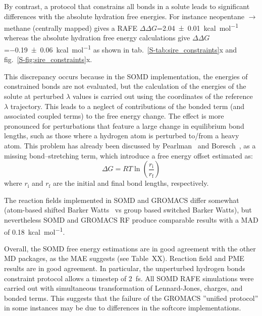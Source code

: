 \documentclass[journal=jctcce,manuscript=article]{achemso}
\begin{document}
By contrast, a protocol that constrains all bonds in a solute leads to 
significant differences with the absolute hydration free energies. For instance 
neopentane $\rightarrow$ methane (centrally mapped) gives a RAFE
$\Delta\Delta G$=\SI{2.04 +- 0.01}{kcal.mol^{-1}}  whereas the absolute 
hydration free energy calculations give $\Delta\Delta 
G$=\SI{-0.19+-0.06}{kcal.mol^{-1}} as shown in 
tab.~\ref{S-tab:sire_constraints}x and fig.~\ref{S-fig:sire_constraints}x.

This discrepancy occurs because in the SOMD implementation, the energies of 
constrained bonds are not evaluated, but the calculation of the energies of the 
solute at perturbed $\lambda$ values is carried out using the coordinates of 
the reference $\lambda$ trajectory. This leads to a neglect of contributions of 
the bonded term (and associated coupled terms) to the free energy change. The 
effect is more pronounced for perturbations that feature a large change in 
equilibrium bond lengths, such as those where a hydrogen atom is perturbed 
to/from a heavy atom. This problem has already been discussed by Pearlman~\cite{pearlman1991overlooked} and Boresch~\cite{doi:10.1021/jp981628n, doi:10.1021/jp981629f}, as a missing bond--stretching term, which introduce a free energy offset estimated as:
\begin{equation}
 \label{eq:allbondserror}
 \Delta G= RT\ln \left ( \frac{r_{\mathrm{i}}}{r_\mathrm{f}} \right)
\end{equation}
where $r_{\mathrm{i}}$ and $r_{\mathrm{f}}$ are the initial and final bond 
lengths, respectively. 

The reaction fields implemented in SOMD and GROMACS differ somewhat (atom-based 
shifted Barker Watts~\cite{doi:10.1080/00268977300102101} vs group based 
switched Barker Watts), but nevertheless SOMD and GROMACS RF produce comparable results with a MAD of \SI{0.18}{kcal.mol^{-1}}.

Overall, the SOMD free energy estimations are in good agreement with the 
other MD packages, as the MAE suggests (see Table~XX).  Reaction field and PME 
results are in good agreement.  In particular, the unperturbed hydrogen bonds 
constraint protocol allows a timestep of \SI{2}{fs}. All SOMD RAFE simulations were carried out with simultaneous transformation of Lennard-Jones, charges, and bonded terms. This suggests that the failure of the GROMACS ''unified protocol'' in some 
instances may be due to differences in the softcore implementations. 

\end{document}
